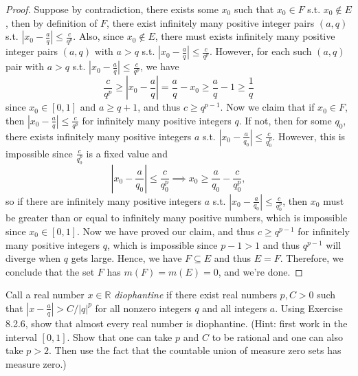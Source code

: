 \begin{proof}
    Suppose by contradiction, there exists some \(x_0\) such that \(x_0 \in F\) s.t. \(x_0 \notin E\), then by definition of \(F\), there exist infinitely many positive integer pairs \((a, q)\) s.t.  \(\left\vert x_0 - \frac{a}{q} \right\vert \le \frac{c}{q^p}\). Also, since \(x_0 \notin E\), there must exists infinitely many positive integer pairs \((a, q)\) with \(a > q\) s.t. \(\left\vert x_0 - \frac{a}{q} \right\vert \le \frac{c}{q^p}\). However, for each such \((a, q)\) pair with \(a > q\) s.t. \(\left\vert x_0 - \frac{a}{q} \right\vert \le \frac{c}{q^p} \), we have
     \[
        \frac{c}{q^p} \ge \left\vert x_0 - \frac{a}{q} \right\vert = \frac{a}{q} - x_0 \ge \frac{a}{q} - 1 \ge \frac{1}{q} 
     \]      
     since \(x_0 \in [0, 1]\) and \(a \ge q + 1\), and thus \(c \ge q^{p- 1}\). Now we claim that if \(x_0 \in F\), then \(\left\vert x_0 - \frac{a}{q} \right\vert \le \frac{c}{q^p} \) for infinitely many positive integers \(q\). If not, then for some \(q_0\), there exists infinitely many positive integers \(a\) s.t. \(\left\vert x_0 - \frac{a}{q_0} \right\vert \le \frac{c}{q_0^p} \). However, this is impossible since \(\frac{c}{q_0^p}\) is a fixed value and 
     \[
        \left\vert x_0 - \frac{a}{q_0} \right\vert \le \frac{c}{q_0^p} \implies x_0 \ge \frac{a}{q_0} - \frac{c}{q_0^p}, 
     \]        
     so if there are infinitely many positive integers \(a\) s.t. \(\left\vert x_0 - \frac{a}{q_0} \right\vert \le \frac{c}{q_0^p} \), then \(x_0\) must be greater than or equal to infinitely many positive numbers, which is impossible since \(x_0 \in [0, 1]\). Now we have proved our claim, and thus \(c \ge q^{p-1}\) for infinitely many positive integers \(q\), which is impossible since \(p - 1 > 1\) and thus \(q^{p-1}\) will diverge when \(q\) gets large. Hence, we have \(F \subseteq E\) and thus \(E = F\). Therefore, we conclude that the set \(F\) has \(m(F) = m(E) = 0\), and we're done.  
\end{proof}

\begin{problem}
    Call a real number $x\in\mathbb{R}$ \emph{diophantine} if there exist real numbers $p,C>0$ such that
$|x-\frac{a}{q}|>C/|q|^p$ for all nonzero integers $q$ and all integers $a$.
Using Exercise 8.2.6, show that almost every real number is diophantine.
(Hint: first work in the interval $[0,1]$.
Show that one can take $p$ and $C$ to be rational and one can also take $p>2$.
Then use the fact that the countable union of measure zero sets has measure zero.)
\end{problem}

